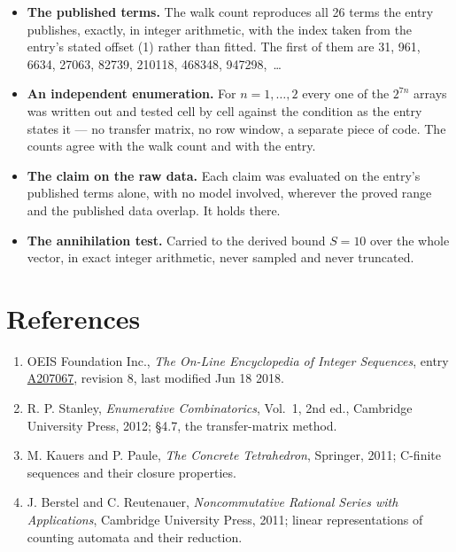 \documentclass[11pt]{article}
\theoremstyle{definition}
\begin{document}
\begin{itemize}

\item {\bfseries The published terms.} The walk count reproduces all 26 terms the entry publishes, exactly, in integer arithmetic, with the index taken from the entry's stated offset (1) rather than fitted. The first of them are 31, 961, 6634, 27063, 82739, 210118, 468348, 947298,~\dots

\item {\bfseries An independent enumeration.} For $n = 1,\dots,2$ every one of the $2^{7n}$ arrays was written out and tested cell by cell against the condition as the entry states it --- no transfer matrix, no row window, a separate piece of code. The counts agree with the walk count and with the entry.

\item {\bfseries The claim on the raw data.} Each claim was evaluated on the entry's published terms alone, with no model involved, wherever the proved range and the published data overlap. It holds there.

\item {\bfseries The annihilation test.} Carried to the derived bound $S = 10$ over the whole vector, in exact integer arithmetic, never sampled and never truncated.

\end{itemize}

\section{References}

\begin{enumerate}

\item OEIS Foundation Inc., \emph{The On-Line Encyclopedia of Integer Sequences}, entry \href{https://oeis.org/A207067}{A207067}, revision 8, last modified Jun 18 2018.

\item R. P. Stanley, \emph{Enumerative Combinatorics}, Vol.~1, 2nd ed., Cambridge University Press, 2012; \S4.7, the transfer-matrix method.

\item M. Kauers and P. Paule, \emph{The Concrete Tetrahedron}, Springer, 2011; C-finite sequences and their closure properties.

\item J. Berstel and C. Reutenauer, \emph{Noncommutative Rational Series with Applications}, Cambridge University Press, 2011; linear representations of counting automata and their reduction.

\end{enumerate}
\end{document}
